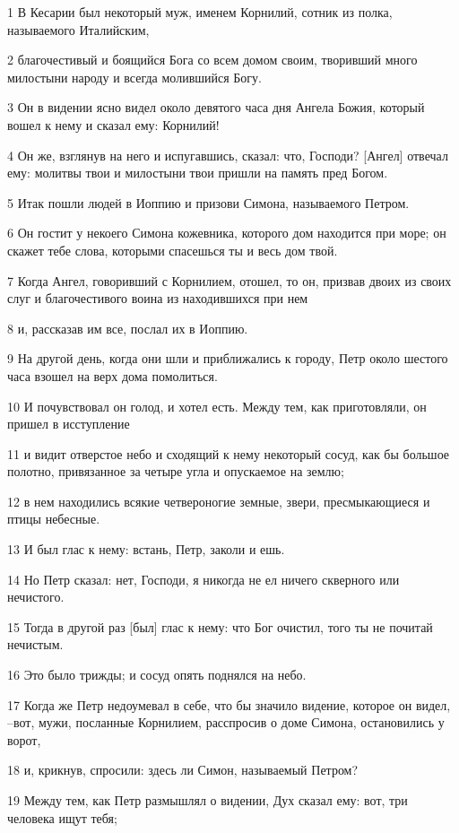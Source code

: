 \par 1 В Кесарии был некоторый муж, именем Корнилий, сотник из полка, называемого Италийским,
\par 2 благочестивый и боящийся Бога со всем домом своим, творивший много милостыни народу и всегда молившийся Богу.
\par 3 Он в видении ясно видел около девятого часа дня Ангела Божия, который вошел к нему и сказал ему: Корнилий!
\par 4 Он же, взглянув на него и испугавшись, сказал: что, Господи? [Ангел] отвечал ему: молитвы твои и милостыни твои пришли на память пред Богом.
\par 5 Итак пошли людей в Иоппию и призови Симона, называемого Петром.
\par 6 Он гостит у некоего Симона кожевника, которого дом находится при море; он скажет тебе слова, которыми спасешься ты и весь дом твой.
\par 7 Когда Ангел, говоривший с Корнилием, отошел, то он, призвав двоих из своих слуг и благочестивого воина из находившихся при нем
\par 8 и, рассказав им все, послал их в Иоппию.
\par 9 На другой день, когда они шли и приближались к городу, Петр около шестого часа взошел на верх дома помолиться.
\par 10 И почувствовал он голод, и хотел есть. Между тем, как приготовляли, он пришел в исступление
\par 11 и видит отверстое небо и сходящий к нему некоторый сосуд, как бы большое полотно, привязанное за четыре угла и опускаемое на землю;
\par 12 в нем находились всякие четвероногие земные, звери, пресмыкающиеся и птицы небесные.
\par 13 И был глас к нему: встань, Петр, заколи и ешь.
\par 14 Но Петр сказал: нет, Господи, я никогда не ел ничего скверного или нечистого.
\par 15 Тогда в другой раз [был] глас к нему: что Бог очистил, того ты не почитай нечистым.
\par 16 Это было трижды; и сосуд опять поднялся на небо.
\par 17 Когда же Петр недоумевал в себе, что бы значило видение, которое он видел, --вот, мужи, посланные Корнилием, расспросив о доме Симона, остановились у ворот,
\par 18 и, крикнув, спросили: здесь ли Симон, называемый Петром?
\par 19 Между тем, как Петр размышлял о видении, Дух сказал ему: вот, три человека ищут тебя;
